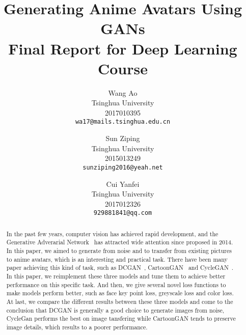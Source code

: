 \documentclass[10pt,twocolumn,letterpaper]{article}
\begin{document}
\title{Generating Anime Avatars Using GANs \\ \large Final Report for Deep Learning Course}

\author{Wang Ao\\
Tsinghua University\\
2017010395\\
{\tt\small wa17@mails.tsinghua.edu.cn}
\and
Sun Ziping\\
Tsinghua University\\
2015013249\\
{\tt\small sunziping2016@yeah.net}
\and
Cui Yanfei\\
Tsinghua University\\
2017012326\\
{\tt\small 929881841@qq.com}
}

\maketitle

\begin{abstract}
In the past few years, computer vision has achieved rapid development, and the
Generative Adverarial Network~\cite{GAN} has attracted wide attention since
proposed in 2014. In this paper, we aimed to generate from noise and to transfer
from existing pictures to anime avatars, which is an interesting and practical
task. There have been many paper achieving this kind of task, such as
DCGAN~\cite{DCGAN}, CartoonGAN~\cite{CartoonGAN} and
CycleGAN~\cite{CycleGAN2017}. In this paper, we reimplement these three models
and tune them to achieve better performance on this specific task. And then, we
give several novel loss functions to make models perform better, such as face
key point loss, greyscale loss and color loss. At last, we compare the different
results between these three models and come to the conclusion that DCGAN is
generally a good choice to generate images from noise, CycleGan performs the
best on image tansfering while CartoonGAN tends to preserve image details, which
results to a poorer performance.
\end{abstract}
\end{document}
